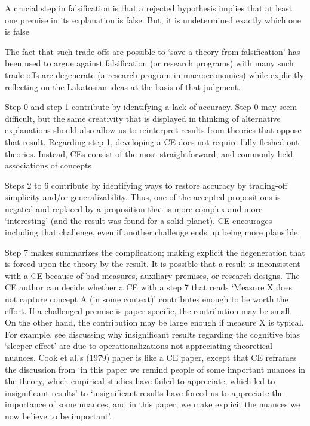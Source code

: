 \documentclass[empirical, authordate, meta]{jote-new-article}
\begin{document}
A crucial step in falsification is that a rejected hypothesis implies that at least one premise in its explanation is false. But, it is undetermined exactly which one is false \parencite{Hines1988, Lakatos1970, Søberg2005, Weick1999}

The fact that such trade-offs are possible to ‘save a theory from falsification' has been used to argue against falsification \parencite{Søberg2005}(or research programs) with many such trade-offs are degenerate \parencite{Lakatos1970, Cross1982}(a research program in macroeconomics) while explicitly reflecting on the Lakatosian ideas at the basis of that judgment.

Step 0 and step 1 contribute by identifying a lack of accuracy. Step 0 may seem difficult, but the same creativity that is displayed in thinking of alternative explanations should also allow us to reinterpret results from theories that oppose that result. Regarding step 1, developing a CE does not require fully fleshed-out theories. Instead, CEs consist of the most straightforward, and commonly held, associations of concepts \parencite[][i,.,e,.,,, ,accepted, ,propositionsin]{Davis1971, Spector2011}

Steps 2 to 6 contribute by identifying ways to restore accuracy by trading-off simplicity and/or generalizability. Thus, one of the accepted propositions is negated and replaced by a proposition that is more complex and more ‘interesting' \parencite{Davis1971}(and the result was found for a solid planet). CE encourages including that challenge, even if another challenge ends up being more plausible.

Step 7 makes summarizes the complication; making explicit the degeneration that is forced upon the theory by the result. It is possible that a result is inconsistent with a CE because of bad measures, auxiliary premises, or research designs. The CE author can decide whether a CE with a step 7 that reads ‘Measure X does not capture concept A (in some context)' contributes enough to be worth the effort. If a challenged premise is paper-specific, the contribution may be small. On the other hand, the contribution may be large enough if measure X is typical. For example, see \textcite{Cook1979} discussing why insignificant results regarding the cognitive bias ‘sleeper effect' are due to operationalizations not appreciating theoretical nuances. Cook et al.'s (1979) paper is like a CE paper, except that CE reframes the discussion from ‘in this paper we remind people of some important nuances in the theory, which empirical studies have failed to appreciate, which led to insignificant results' to ‘insignificant results have forced us to appreciate the importance of some nuances, and in this paper, we make explicit the nuances we now believe to be important'. 
\end{document}
